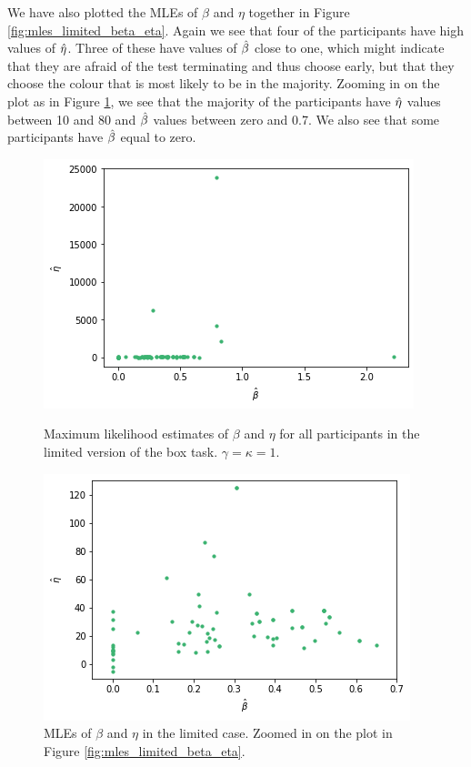 We have also plotted the MLEs of $\beta$ and $\eta$ together in Figure \ref{fig:mles_limited_beta_eta}. Again we see that four of the participants have high values of $\hat{\eta}$. Three of these have values of $\hat{\beta}$ close to one, which might indicate that they are afraid of the test terminating and thus choose early, but that they choose the colour that is most likely to be in the majority. Zooming in on the plot as in Figure \ref{fig:mles_limited_beta_eta_zoomed}, we see that the majority of the participants have $\hat{\eta}$ values between 10 and 80 and $\hat{\beta}$ values between zero and 0.7. We also see that some participants have $\hat{\beta}$ equal to zero. 
\begin{figure}
    \centering
    \begin{minipage}{0.48\textwidth}
        \centering
        \includegraphics[scale=0.38]{pictures/plotted_mles_limited_beta_eta_gk1.png}
        \caption[MLEs of $\beta$ and $\eta$, limited. $\gamma=\kappa=1$]{Maximum likelihood estimates of $\beta$ and $\eta$ for all participants in the limited version of the box task. $\gamma=\kappa=1$.}
        \label{fig:mles_limited_beta_eta}
    \end{minipage}
    \hfill
    \begin{minipage}{0.48\textwidth}
        \centering
        \includegraphics[scale=0.38]{pictures/plotted_mles_limited_beta_eta_zoomed_gk1.png}
        \caption[MLEs of $\beta$ and $\eta$ zoomed, limited. $\gamma=\kappa=1$]{MLEs of $\beta$ and $\eta$ in the limited case. Zoomed in on the plot in Figure \ref{fig:mles_limited_beta_eta}.}
        \label{fig:mles_limited_beta_eta_zoomed}
    \end{minipage}
\end{figure}


